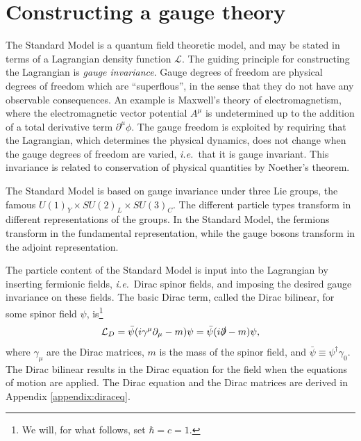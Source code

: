 \documentclass[twoside,english]{uiofysmaster}
\begin{document}
\section{Constructing a gauge theory}

The Standard Model is a quantum field theoretic model, and may be stated in terms of a Lagrangian density function $\mathcal{L}$. The guiding principle for constructing the Lagrangian is {\it gauge invariance}. Gauge degrees of freedom are physical degrees of freedom which are ``superflous'', in the sense that they do not have any observable consequences. An example is Maxwell's theory of electromagnetism, where the electromagnetic vector potential $A^\mu$ is undetermined up to the addition of a total derivative term $\partial^\mu \phi$. The gauge freedom is exploited by requiring that the Lagrangian, which determines the physical dynamics, does not change when the gauge degrees of freedom are varied, {\it i.e.}\ that it is gauge invariant. This invariance is related to conservation of physical quantities by Noether's theorem.

The Standard Model is based on gauge invariance under three Lie groups, the famous $U(1)_Y\times SU(2)_L\times SU(3)_C$. The different particle types transform in different representations of the groups. In the Standard Model, the fermions transform in the fundamental representation, while the gauge bosons transform in the adjoint representation.

The particle content of the Standard Model is input into the Lagrangian by inserting fermionic fields, {\it i.e.}\ Dirac spinor fields, and imposing the desired gauge invariance on these fields. The basic Dirac term, called the Dirac bilinear, for some spinor field $\psi$, is\footnote{We will, for what follows, set $\hbar = c = 1$.} 
\begin{align}
	\mathcal{L}_D = \bar \psi (i\gamma^\mu \partial_\mu - m) \psi = \bar \psi (i\slashed\partial - m)\psi, \label{eq:diracbilinear}
\end{align}
where $\gamma_\mu$ are the Dirac matrices, $m$ is the mass of the spinor field, and $\bar\psi \equiv \psi^\dag \gamma_0$. The Dirac bilinear results in the Dirac equation for the field when the equations of motion are applied. The Dirac equation and the Dirac matrices are derived in Appendix \ref{appendix:diraceq}.
\end{document}

